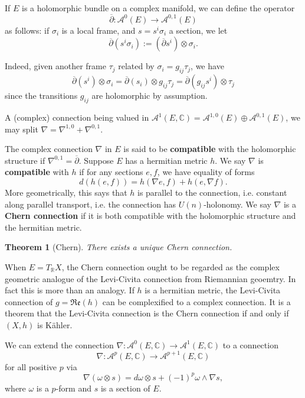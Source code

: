 \documentclass[11pt]{amsart}
\newcommand{\cA}{\mathcal{A}}
\newcommand{\fR}{\mathfrak{R}}
\newcommand{\fe}{\mathfrak{e}}
\newcommand{\tbf}[1]{\textbf{#1}}
\newcommand{\R}{\mathbb R}
\newcommand{\C}{\mathbb C}
\newtheorem{theorem}{Theorem}[subsection]
\theoremstyle{definition}
\numberwithin{equation}{section}
\begin{document}
If $E$ is a holomorphic bundle on a complex manifold, we can define the operator
%
\[
\overline\partial:\cA^0(E)\to \cA^{0,1}(E)
\]
%
as follows: if $\sigma_i$ is a local frame, and $s=s^i \sigma_i$ a section, we let
\begin{equation}
\overline\partial(s^i\sigma_i):=(\overline\partial s^i)\otimes \sigma_i.\label{eq: dbar bundle}
\end{equation}

Indeed, given another frame $\tau_j$ related by $\sigma_i=g_{ij}\tau_j$, we have
\[
\overline\partial (s^i)\otimes \sigma_i=\overline \partial(s_i)\otimes g_{ij}\tau_j=\overline\partial(g_{ij}s^i)\otimes \tau_j
\]
since the transitions $g_{ij}$ are holomorphic by assumption.

A (complex) connection being valued in $\cA^1(E,\C)=\cA^{1,0}(E)\oplus\cA^{0,1}(E)$, we may split $\nabla=\nabla^{1,0}+\nabla^{0,1}$.
\begin{definition}
	The complex connection $\nabla$ in $E$ is said to be \tbf{compatible} with the holomorphic structure if $\nabla^{0,1}=\overline\partial$. Suppose $E$ has a hermitian metric $h$. We say $\nabla$ is \tbf{compatible} with $h$ if for any sections $e,f$, we have equality of forms
	\[d(h(e,f))=h(\nabla e,f)+h(e,\nabla f).\]
More geometrically, this says that $h$ is parallel to the connection, i.e. constant along parallel transport, i.e. the connection has $U(n)$-holonomy. We say $\nabla$ is a \tbf{Chern connection} if it is both compatible with the holomorphic structure and the hermitian metric.
\end{definition} 

\begin{theorem}[Chern]
	There exists a unique Chern connection.
\end{theorem}

When $E=T_\R X$, the Chern connection ought to be regarded as the complex geometric analogue of the Levi-Civita connection from Riemannian geoemtry. In fact this is more than an analogy. If $h$ is a hermitian metric, the Levi-Civita connection of $g=\fR\fe(h)$ can be complexified to a complex connection. It is a theorem that the Levi-Civita connection is the Chern connection if and only if $(X,h)$ is Kähler.

We can extend the connection $\nabla:\cA^0(E,\C)\to \cA^1(E,\C)$ to a connection
\[
\nabla:\cA^p(E,\C)\to \cA^{p+1}(E,\C)
\]
for all positive $p$ via
\[
\nabla(\omega\otimes s)=d\omega\otimes s+(-1)^p\omega\wedge\nabla s,
\]
where $\omega$ is a $p$-form and $s$ is a section of $E$.
\end{document}
